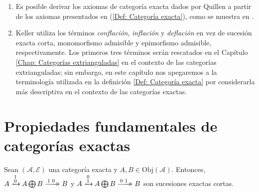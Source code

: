 \documentclass[tesis]{subfiles}
\begin{document}
\begin{Obs}
\begin{enumerate}[label=(\arabic*)]
\item Es posible derivar los axiomas de categoría exacta dados por Quillen\cite[\S 2]{Quillen} a partir de los axiomas presentados en (\ref{Def: Categoría exacta}), como se muestra en \cite{Bühler}.

        \item Keller\cite{Keller} utiliza los términos \emph{conflación}, \emph{inflación} y \emph{deflación} en vez de sucesión exacta corta, monomorfismo admisible y epimorfismo admisible, respectivamente. Los primeros tres términos serán rescatados en el Capítulo \ref{Chap: Categorías extrianguladas} en el contexto de las categorías extrianguladas; sin embargo, en este capítulo nos apegaremos a la terminología utilizada en la definición \ref{Def: Categoría exacta} por considerarla más descriptiva en el contexto de las categorías exactas.

    \end{enumerate}
\end{Obs}

\section{Propiedades fundamentales de categorías exactas} \label{Sec: Propiedades fundamentales de categorías exactas}

\begin{Lema}\label{Bühler-2.7}

    Sean $(\mathscr{A},\mathscr{E})$ una categoría exacta y $A,B\in\text{Obj}(\mathscr{A})$. Entonces, $A\xrightarrow[]{\begin{smallmatrix} 1 \\ 0 \end{smallmatrix}}\mathrel{\mkern-21mu}\rightarrowtail A\bigoplus B\xrightarrow[]{\begin{smallmatrix} 1 & 0 \end{smallmatrix}}\mathrel{\mkern-14mu}\rightarrow B$ y $A\xrightarrow[]{\begin{smallmatrix} 0 \\ 1 \end{smallmatrix}}\mathrel{\mkern-21mu}\rightarrowtail A\bigoplus B\xrightarrow[]{\begin{smallmatrix} 0 & 1 \end{smallmatrix}}\mathrel{\mkern-14mu}\rightarrow B$ son sucesiones exactas cortas.
\end{Lema}
\end{document}
